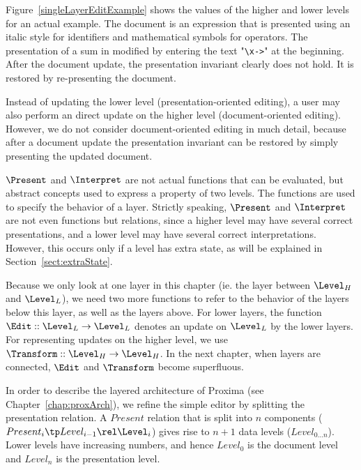 Figure~\ref{singleLayerEditExample} shows the values of the higher and lower levels for an actual example. The document is an expression that is presented using an italic style for identifiers and mathematical symbols for operators. The presentation of a sum in modified by entering the text "\verb|\x->|" at the beginning. After the document update, the presentation invariant clearly does not hold. It is restored by re-presenting the document.

Instead of updating the lower level (presentation-oriented editing), a user may also perform an direct update on the higher level (document-oriented editing). However, we do not consider document-oriented editing in much detail, because after a document update the presentation invariant can be restored by simply presenting the updated document.


\bc
$\Present$ and $\Interpret$ are not actual functions that can be evaluated, but abstract concepts used to express a property of two levels. The functions are used to specify the behavior of a layer.
Strictly speaking, $\Present$ and $\Interpret$ are not even functions but relations, since a higher level may have several correct presentations, and a lower level may have several correct interpretations. However, this occurs only if a level has extra state, as will be explained in Section~\ref{sect:extraState}. \ec

\bc Because we only look at one layer in this chapter (ie. the layer between $\Level_{H}$ and $\Level_{L}$), we need two more functions to refer to the behavior of the layers below this layer, as well as the layers above. For lower layers, the function 
$\Edit :: \Level_{L} \rightarrow \Level_{L}$ denotes an update on $\Level_{L}$ by the lower layers. For representing updates on the higher level, we use 
$\Transform :: \Level_{H} \rightarrow \Level_{H}$. In the next chapter, when layers are connected, $\Edit$ and $\Transform$ become superfluous.\ec



In order to describe the layered architecture of Proxima (see Chapter~\ref{chap:proxArch}), we refine the simple editor by splitting the presentation relation. A $Present$ relation that is split into $n$ components 
($Present_{i} \tp Level_{i-1} \rel \Level_{i}$) gives rise to $n+1$ data levels ($Level_{0 \dots n}$). Lower levels have increasing numbers, and hence $Level_{0}$ is the document level and $Level_{n}$ is the presentation level.

